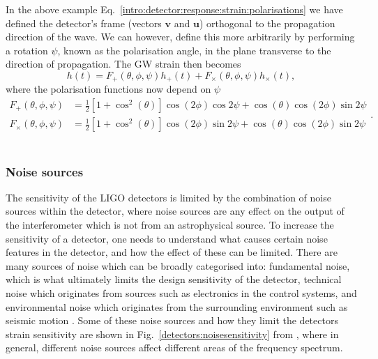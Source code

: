 In the above example Eq.~\ref{intro:detector:response:strain:polarisations} we
have defined the detector's frame (vectors $\bm{v}$ and $\bm{u}$) orthogonal to the propagation direction of the wave. 
We can however, define this more arbitrarily by performing a rotation $\psi$, known as the polarisation angle, in the plane transverse to the direction of propagation.
The \gls{GW} strain then becomes
\begin{equation}
	\label{intro:detector:strain_2}
	h(t) = F_{+}(\theta,\phi, \psi)h_{+}(t) + F_{\times}(\theta,\phi,\psi)h_{\times}(t),
\end{equation}
where the polarisation functions now depend on $\psi$ \citep{maggioreGravitationalWaves}
\begin{equation}
\label{intro:detector:polarisationfuncs}
	\begin{split}
	F_{+}(\theta,\phi,\psi) &= \frac{1}{2} \left[ 1 + \cos^2 \left(\theta\right) \right] \cos\left(2\phi\right) \cos{2\psi} + \cos \left(\theta\right) \cos \left(2\phi \right) \sin{2\psi} \\
	F_{\times}(\theta,\phi,\psi) &= \frac{1}{2} \left[ 1 + \cos^2 \left(\theta\right) \right] \cos\left(2\phi\right) \sin{2\psi} + \cos \left(\theta\right) \cos \left(2\phi \right) \sin{2\psi}
	\end{split}.
\end{equation}
~

\subsubsection{\label{intro:detector:noise}Noise sources}

The sensitivity of the \gls{LIGO} detectors is limited by the combination of
noise sources within the detector, where noise sources are any effect on the
output of the interferometer which is not from an astrophysical source.  To
increase the sensitivity of a detector, one needs to understand what causes
certain noise features in the detector, and how the effect of these can be
limited.  There are many sources of noise which can be broadly categorised
into: fundamental noise, which is what ultimately limits the design sensitivity
of the detector, technical noise which originates from sources such as
electronics in the control systems, and environmental noise which originates
from the surrounding environment such as seismic motion
\citep{martynov2016SensitivityAdvanced}.  Some of these noise sources and how
they limit the detectors strain sensitivity are shown in
Fig.~\ref{detectors:noisesensitivity} from \citep{aasi2015AdvancedLIGO}, where
in general, different noise sources affect different areas of the frequency
spectrum.

